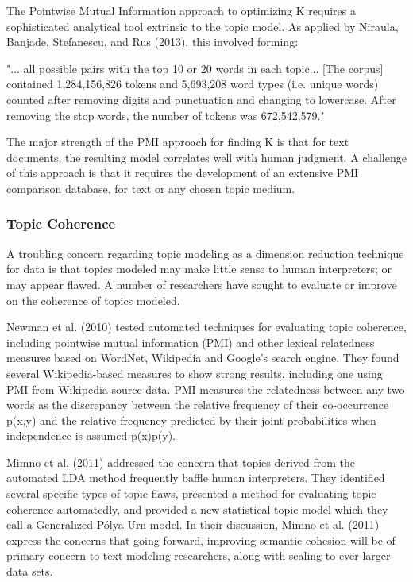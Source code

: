 \documentclass[conference]{IEEEtran}
\begin{document}
The Pointwise Mutual Information approach to optimizing K requires a sophisticated analytical tool extrinsic to the topic model. As applied by Niraula, Banjade, Stefanescu, and Rus (2013), this involved forming:

\begin{quoting}
"... all possible pairs with the top 10 or 20 words in each topic... [The corpus] contained 1,284,156,826 tokens and 5,693,208 word types (i.e. unique words) counted after removing digits and punctuation and changing to lowercase. After removing the stop words, the number of tokens was 672,542,579."
\end{quoting}

The major strength of the PMI approach for finding K is that for text documents, the resulting model correlates well with human judgment. A challenge of this approach is that it requires the development of an extensive PMI comparison database, for text or any chosen topic medium.
 
\subsubsection{Topic Coherence}
A troubling concern regarding topic modeling as a dimension reduction technique for data is that topics modeled may make little sense to human interpreters; or may appear flawed. A number of researchers have sought to evaluate or improve on the coherence of topics modeled.
 
Newman et al. (2010) tested automated techniques for evaluating topic coherence, including pointwise mutual information (PMI) and other lexical relatedness measures based on WordNet, Wikipedia and Google's search engine. They found several Wikipedia-based measures to show strong results, including one using PMI from Wikipedia source data. PMI measures the relatedness between any two words as the discrepancy between the relative frequency of their co-occurrence p(x,y) and the relative frequency predicted by their joint probabilities when independence is assumed p(x)p(y).
 
Mimno et al. (2011) addressed the concern that topics derived from the automated LDA method frequently baffle human interpreters. They identified several specific types of topic flaws, presented a method for evaluating topic coherence automatedly, and provided a new statistical topic model which they call a Generalized P\'{o}lya Urn model. In their discussion, Mimno et al. (2011) express the concerns that going forward, improving semantic cohesion will be of primary concern to text modeling researchers, along with scaling to ever larger data sets.
\end{document}

